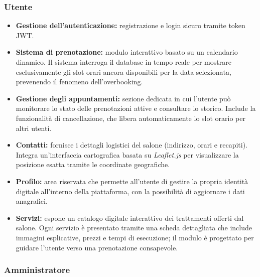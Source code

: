 \documentclass[12pt,a4paper]{article}
\begin{document}
\subsubsection{Utente}

\begin{itemize}
    \item \textbf{Gestione dell'autenticazione:} registrazione e login sicuro tramite token JWT.
    \item \textbf{Sistema di prenotazione:} modulo interattivo basato su un calendario dinamico. Il sistema interroga il database in tempo reale per mostrare esclusivamente gli slot orari ancora disponibili per la data selezionata, prevenendo il fenomeno dell'overbooking.
    \item \textbf{Gestione degli appuntamenti:} sezione dedicata in cui l'utente può monitorare lo stato delle prenotazioni attive e consultare lo storico. Include la funzionalità di cancellazione, che libera automaticamente lo slot orario per altri utenti.
    \item \textbf{Contatti:} fornisce i dettagli logistici del salone (indirizzo, orari e recapiti). Integra un'interfaccia cartografica basata su \textit{Leaflet.js} per visualizzare la posizione esatta tramite le coordinate geografiche.
    \item \textbf{Profilo:} area riservata che permette all'utente di gestire la propria identità digitale all'interno della piattaforma, con la possibilità di aggiornare i dati anagrafici.
    \item \textbf{Servizi:} espone un catalogo digitale interattivo dei trattamenti offerti dal salone. Ogni servizio è presentato tramite una scheda dettagliata che include immagini esplicative, prezzi e tempi di esecuzione; il modulo è progettato per guidare l'utente verso una prenotazione consapevole.
\end{itemize}

\newpage

\subsubsection{Amministratore}
\end{document}
